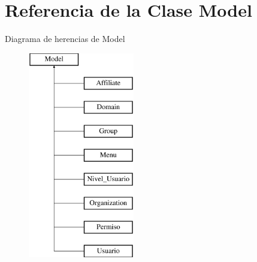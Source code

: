 \hypertarget{class_model}{}\section{Referencia de la Clase Model}
\label{class_model}
Diagrama de herencias de Model\begin{figure}[H]
\begin{center}
\leavevmode
\includegraphics[height=9.000000cm]{class_model}
\end{center}
\end{figure}
